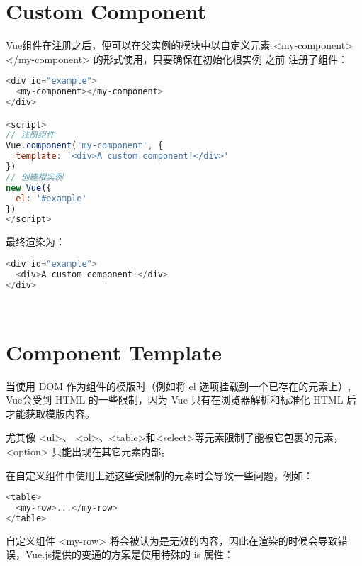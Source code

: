 \section{Custom Component}


Vue组件在注册之后，便可以在父实例的模块中以自定义元素 <my-component></my-component> 的形式使用，只要确保在初始化根实例 之前 注册了组件：


\begin{lstlisting}[language=JavaScript]
<div id="example">
  <my-component></my-component>
</div>

<script>
// 注册组件
Vue.component('my-component', {
  template: '<div>A custom component!</div>'
})
// 创建根实例
new Vue({
  el: '#example'
})
</script>
\end{lstlisting}

最终渲染为：

\begin{lstlisting}[language=JavaScript]
<div id="example">
  <div>A custom component!</div>
</div>
\end{lstlisting}




\begin{lstlisting}[language=JavaScript]

\end{lstlisting}




\begin{lstlisting}[language=JavaScript]

\end{lstlisting}



\section{Component Template}


当使用 DOM 作为组件的模版时（例如将 el 选项挂载到一个已存在的元素上）, Vue会受到 HTML 的一些限制，因为 Vue 只有在浏览器解析和标准化 HTML 后才能获取模版内容。

尤其像 <ul>、 <ol>、<table>和<select>等元素限制了能被它包裹的元素， <option> 只能出现在其它元素内部。


在自定义组件中使用上述这些受限制的元素时会导致一些问题，例如：

\begin{lstlisting}[language=JavaScript]
<table>
  <my-row>...</my-row>
</table>
\end{lstlisting}

自定义组件 <my-row> 将会被认为是无效的内容，因此在渲染的时候会导致错误，Vue.js提供的变通的方案是使用特殊的 is 属性：

